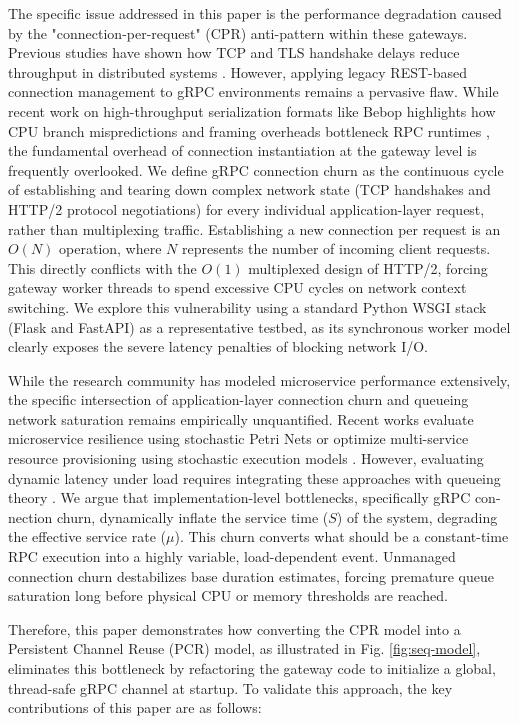 \documentclass{ieeeaccess}
\begin{document}
The specific issue addressed in this paper is the performance degradation caused by the "connection-per-request" (CPR) anti-pattern within these gateways. Previous studies have shown how TCP and TLS handshake delays reduce throughput in distributed systems \cite{Guo2020Stateful}. However, applying legacy REST-based connection management to gRPC environments remains a pervasive flaw. While recent work on high-throughput serialization formats like Bebop highlights how CPU branch mispredictions and framing overheads bottleneck RPC runtimes \cite{sampson2026simplicity}, the fundamental overhead of connection instantiation at the gateway level is frequently overlooked. We define gRPC connection churn as the continuous cycle of establishing and tearing down complex network state (TCP handshakes and HTTP/2 protocol negotiations) for every individual application-layer request, rather than multiplexing traffic. Establishing a new connection per request is an $O(N)$ operation, where $N$ represents the number of incoming client requests. This directly conflicts with the $O(1)$ multiplexed design of HTTP/2, forcing gateway worker threads to spend excessive CPU cycles on network context switching. We explore this vulnerability using a standard Python WSGI stack \cite{wsgi-pep} (Flask and FastAPI) as a representative testbed, as its synchronous worker model clearly exposes the severe latency penalties of blocking network I/O.

While the research community has modeled microservice performance extensively, the specific intersection of application-layer connection churn and queueing network saturation remains empirically unquantified. Recent works evaluate microservice resilience using stochastic Petri Nets \cite{pinheiro2024performance} or optimize multi-service resource provisioning using stochastic execution models \cite{carnevali2025compositional}. However, evaluating dynamic latency under load requires integrating these approaches with queueing theory \cite{DAuria2021AnMQA}. We argue that implementation-level bottlenecks, specifically gRPC con-nection churn, dynamically inflate the service time ($S$) of the system, degrading the effective service rate ($\mu$). This churn converts what should be a constant-time RPC execution into a highly variable, load-dependent event. Unmanaged connection churn destabilizes base duration estimates, forcing premature queue saturation long before physical CPU or memory thresholds are reached.

Therefore, this paper demonstrates how converting the CPR model into a Persistent Channel Reuse (PCR) model, as illustrated in Fig. \ref{fig:seq-model}, eliminates this bottleneck by refactoring the gateway code to initialize a global, thread-safe gRPC channel at startup. To validate this approach, the key contributions of this paper are as follows:
\end{document}
